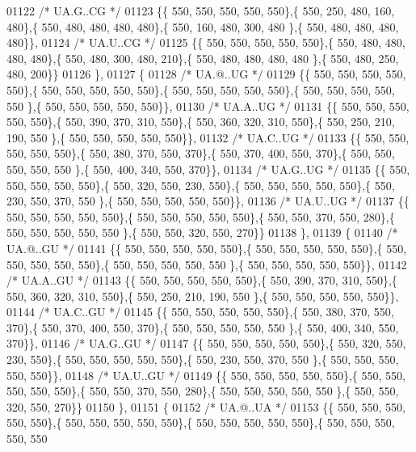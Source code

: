 \begin{DoxyCode}
01122 \textcolor{comment}{/* UA.G..CG */}
01123 \{\{ 550, 550, 550, 550, 550\},\{ 550, 250, 480, 160, 480\},\{ 550, 480, 480, 480, 480\},\{ 550, 160, 480, 300, 480
      \},\{ 550, 480, 480, 480, 480\}\},
01124 \textcolor{comment}{/* UA.U..CG */}
01125 \{\{ 550, 550, 550, 550, 550\},\{ 550, 480, 480, 480, 480\},\{ 550, 480, 300, 480, 210\},\{ 550, 480, 480, 480, 480
      \},\{ 550, 480, 250, 480, 200\}\}
01126 \},
01127 \{
01128 \textcolor{comment}{/* UA.@..UG */}
01129 \{\{ 550, 550, 550, 550, 550\},\{ 550, 550, 550, 550, 550\},\{ 550, 550, 550, 550, 550\},\{ 550, 550, 550, 550, 550
      \},\{ 550, 550, 550, 550, 550\}\},
01130 \textcolor{comment}{/* UA.A..UG */}
01131 \{\{ 550, 550, 550, 550, 550\},\{ 550, 390, 370, 310, 550\},\{ 550, 360, 320, 310, 550\},\{ 550, 250, 210, 190, 550
      \},\{ 550, 550, 550, 550, 550\}\},
01132 \textcolor{comment}{/* UA.C..UG */}
01133 \{\{ 550, 550, 550, 550, 550\},\{ 550, 380, 370, 550, 370\},\{ 550, 370, 400, 550, 370\},\{ 550, 550, 550, 550, 550
      \},\{ 550, 400, 340, 550, 370\}\},
01134 \textcolor{comment}{/* UA.G..UG */}
01135 \{\{ 550, 550, 550, 550, 550\},\{ 550, 320, 550, 230, 550\},\{ 550, 550, 550, 550, 550\},\{ 550, 230, 550, 370, 550
      \},\{ 550, 550, 550, 550, 550\}\},
01136 \textcolor{comment}{/* UA.U..UG */}
01137 \{\{ 550, 550, 550, 550, 550\},\{ 550, 550, 550, 550, 550\},\{ 550, 550, 370, 550, 280\},\{ 550, 550, 550, 550, 550
      \},\{ 550, 550, 320, 550, 270\}\}
01138 \},
01139 \{
01140 \textcolor{comment}{/* UA.@..GU */}
01141 \{\{ 550, 550, 550, 550, 550\},\{ 550, 550, 550, 550, 550\},\{ 550, 550, 550, 550, 550\},\{ 550, 550, 550, 550, 550
      \},\{ 550, 550, 550, 550, 550\}\},
01142 \textcolor{comment}{/* UA.A..GU */}
01143 \{\{ 550, 550, 550, 550, 550\},\{ 550, 390, 370, 310, 550\},\{ 550, 360, 320, 310, 550\},\{ 550, 250, 210, 190, 550
      \},\{ 550, 550, 550, 550, 550\}\},
01144 \textcolor{comment}{/* UA.C..GU */}
01145 \{\{ 550, 550, 550, 550, 550\},\{ 550, 380, 370, 550, 370\},\{ 550, 370, 400, 550, 370\},\{ 550, 550, 550, 550, 550
      \},\{ 550, 400, 340, 550, 370\}\},
01146 \textcolor{comment}{/* UA.G..GU */}
01147 \{\{ 550, 550, 550, 550, 550\},\{ 550, 320, 550, 230, 550\},\{ 550, 550, 550, 550, 550\},\{ 550, 230, 550, 370, 550
      \},\{ 550, 550, 550, 550, 550\}\},
01148 \textcolor{comment}{/* UA.U..GU */}
01149 \{\{ 550, 550, 550, 550, 550\},\{ 550, 550, 550, 550, 550\},\{ 550, 550, 370, 550, 280\},\{ 550, 550, 550, 550, 550
      \},\{ 550, 550, 320, 550, 270\}\}
01150 \},
01151 \{
01152 \textcolor{comment}{/* UA.@..UA */}
01153 \{\{ 550, 550, 550, 550, 550\},\{ 550, 550, 550, 550, 550\},\{ 550, 550, 550, 550, 550\},\{ 550, 550, 550, 550, 550

\end{DoxyCode}
